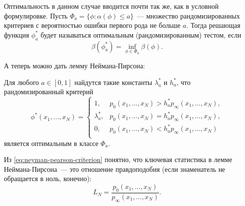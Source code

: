 Оптимальность в данном случае вводится почти так же, как в условной 
формулировке. Пусть \(\Phi_{a} = \{\phi : \alpha(\phi) \leq a\}\)~--- множество 
рандомизированных критериев с вероятностью ошибки первого рода не больше \(a\). 
Тогда решающая функция \(\phi_{a}^{*}\) будет называться оптимальным 
(рандомизированным) тестом, если 
\begin{equation}\label{eq:optimal-random-test}
	\beta(\phi_{a}^{*}) = \inf\limits_{\phi \in \Phi_{a}} \beta(\phi).
\end{equation}

А теперь можно дать лемму Неймана-Пирсона:
\begin{lemma}
	Для любого \(a \in [0, 1]\) найдутся такие константы \(\lambda_{a}^{*}\) и 
	\(h_{a}^{*}\), что рандомизированный критерий
	\begin{equation}\label{eq:neyman-pearson-criterion}
		\phi^{*}(x_{1}, \ldots, x_{N}) = 
		\begin{cases}
			1, & p_{0}(x_{1}, \ldots, x_{N}) > h_{a}^{*}p_{\infty}(x_{1}, 
			\ldots, x_{N}), \\
			\lambda_{a}^{*}, & p_{0}(x_{1}, \ldots, x_{N}) = 
			h_{a}^{*}p_{\infty}(x_{1}, \ldots, x_{N}), \\
			0, & p_{0}(x_{1}, \ldots, x_{N}) < h_{a}^{*}p_{\infty}(x_{1}, 
			\ldots, x_{N}) \\
		\end{cases}
	\end{equation}
	является оптимальным в классе \(\Phi_{a}\).
\end{lemma}

Из \eqref{eq:neyman-pearson-criterion} понятно, что ключевая статистика в лемме 
Неймана-Пирсона~--- это отношение правдоподобия (если знаменатель не обращается 
в ноль, конечно):
\begin{equation}\label{eq:likelihood-ratio}
	L_{N} = \frac{p_{0}(x_{1}, \ldots, x_{N})}{p_{\infty}(x_{1}, \ldots, 
	x_{N})}.
\end{equation}

